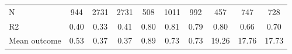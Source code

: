 \begin{tabular}{lccc|ccc|ccc}
N           &         944         &        2731         &        2731         &         508         &        1011         &         992         &         457         &         747         &         728         \\
R2          &        0.40         &        0.33         &        0.41         &        0.80         &        0.81         &        0.79         &        0.80         &        0.66         &        0.70         \\
Mean outcome&        0.53         &        0.37         &        0.37         &        0.89         &        0.73         &        0.73         &       19.26         &       17.76         &       17.73         \\
\bottomrule \end{tabular}

